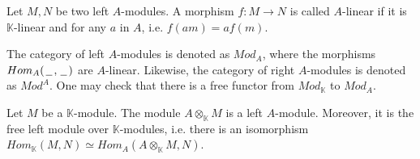 \documentclass[../thesis.tex]{subfiles}
\begin{document}
\begin{definition}[Modules]
\begin{center}
                \end{center}
            \end{definition}

            \begin{definition}
                Let $M,N$ be two left $A$-modules. A morphism $f:M\rightarrow N$ is called $A$-linear if it is $\mathbb{K}$-linear and for any $a$ in $A$, i.e. $f(am) = af(m)$.
            \end{definition}

            The category of left $A$-modules is denoted as $Mod_A$, where the morphisms $Hom_A(\hspace{0.05cm}\underline{\hspace{0.2cm}}\hspace{0.05cm},\hspace{0.05cm}\underline{\hspace{0.2cm}}\hspace{0.05cm})$ are $A$-linear. Likewise, the category of right $A$-modules is denoted as $Mod^A$. One may check that there is a free functor from $Mod_\mathbb{K}$ to $Mod_A$.

            \begin{proposition}\label{prop: free-mod}
                Let $M$ be a $\mathbb{K}$-module. The module $A\otimes_{\mathbb{K}}M$ is a left $A$-module. Moreover, it is the free left module over $\mathbb{K}$-modules, i.e. there is an isomorphism $Hom_{\mathbb{K}}(M,N)\simeq Hom_{A}(A\otimes_{\mathbb{K}}M,N)$.
            \end{proposition}
\end{document}
